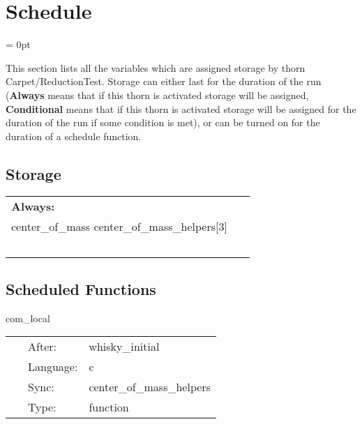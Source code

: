 
\section{Schedule} 


\parskip = 0pt


\noindent This section lists all the variables which are assigned storage by thorn Carpet/ReductionTest.  Storage can either last for the duration of the run ({\bf Always} means that if this thorn is activated storage will be assigned, {\bf Conditional} means that if this thorn is activated storage will be assigned for the duration of the run if some condition is met), or can be turned on for the duration of a schedule function.


\subsection*{Storage}

\hspace{5mm}

 \begin{tabular*}{160mm}{ll} 

{\bf Always:}&  ~ \\ 
 center\_of\_mass center\_of\_mass\_helpers[3] & ~\\ 
~ & ~\\ 
\end{tabular*} 


\subsection*{Scheduled Functions}
\vspace{5mm}


\hspace{5mm} com\_local 

\hspace{5mm}{\it setup integrands for com calculation } 


\hspace{5mm}

 \begin{tabular*}{160mm}{cll} 
~ & After:  & whisky\_initial \\ 
~ & Language:  & c \\ 
~ & Sync:  & center\_of\_mass\_helpers \\ 
~ & Type:  & function \\ 
\end{tabular*} 


